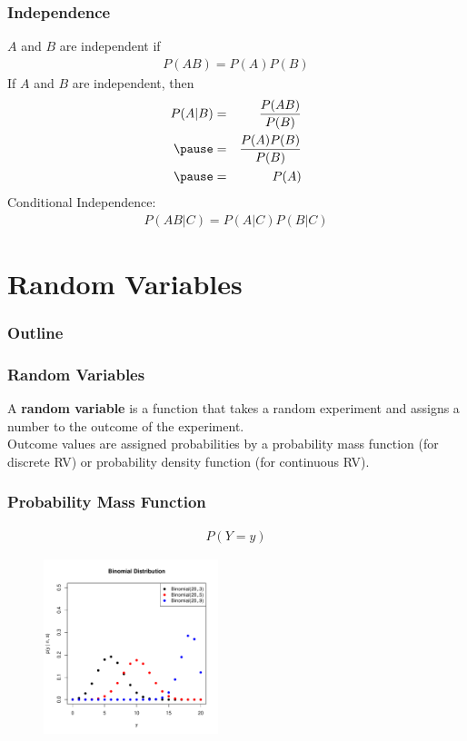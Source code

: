 \documentclass[handout]{beamer}
\begin{document}
\begin{frame}
\frametitle{Independence}
$A$ and $B$ are independent if 
\begin{eqnarray*}
P(AB) = P(A) P(B)
\end{eqnarray*}
\pause
If $A$ and $B$ are independent, then
\begin{eqnarray*}
P(A|B) &=& \frac{P(AB)}{P(B)}\\
\pause
&=& \frac{P(A) P(B)}{P(B)} \\
\pause
&=& P(A)
\end{eqnarray*}
\pause
Conditional Independence:
\begin{eqnarray*}
P(AB | C) = P(A|C) P(B|C)
\end{eqnarray*}
\end{frame}

\section{Random Variables}


\begin{frame}
\frametitle{Outline}
\tableofcontents[currentsection]
\end{frame}

\begin{frame}
\frametitle{Random Variables}
\pause
A \textbf{random variable} is a function that takes a random experiment and
assigns a number to the outcome of the experiment. \\
\pause
\bigskip
Outcome values are assigned probabilities by a probability mass
function (for discrete RV) or probability density function (for
continuous RV).
\end{frame}

\begin{frame}
\frametitle{Probability Mass Function}
\pause
\begin{eqnarray*}
P(Y = y)
\end{eqnarray*}
\pause
\begin{figure}[!htp]
\begin{center}
\includegraphics[width=2in, height=2in]{probability-binomial.pdf}
\end{center}
\end{figure}
\end{frame}
\end{document}
